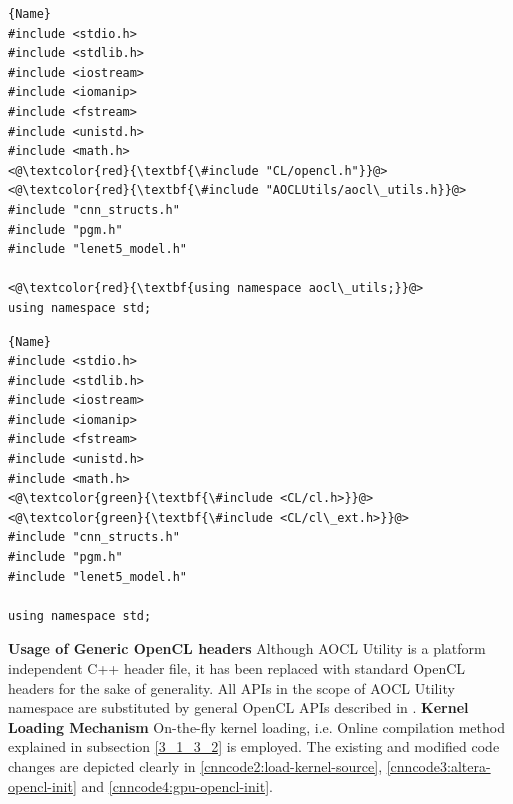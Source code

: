 \newcommand{\grn}{\makebox[0pt][l]{\color{hg}\rule[-4pt]{0.9\linewidth}{10pt}}}
\newcommand{\rd}{\makebox[0pt][l]{\color{hr}\rule[-4pt]{0.9\linewidth}{10pt}}}
\noindent\begin{minipage}{.45\textwidth}
\begin{lstlisting}[caption=Header files for Altera FPGA,frame=tlrb]{Name}
#include <stdio.h>
#include <stdlib.h>
#include <iostream>
#include <iomanip>
#include <fstream>
#include <unistd.h>
#include <math.h>
<@\textcolor{red}{\textbf{\#include "CL/opencl.h"}}@>
<@\textcolor{red}{\textbf{\#include "AOCLUtils/aocl\_utils.h}}@>
#include "cnn_structs.h"
#include "pgm.h"
#include "lenet5_model.h"

<@\textcolor{red}{\textbf{using namespace aocl\_utils;}}@>
using namespace std;
\end{lstlisting}
\end{minipage}\hfill
\begin{minipage}{.45\textwidth}
\begin{lstlisting}[caption=Header files for \\ GPU,frame=tlrb]{Name}
#include <stdio.h>
#include <stdlib.h>
#include <iostream>
#include <iomanip>
#include <fstream>
#include <unistd.h>
#include <math.h>
<@\textcolor{green}{\textbf{\#include <CL/cl.h>}}@>
<@\textcolor{green}{\textbf{\#include <CL/cl\_ext.h>}}@>
#include "cnn_structs.h"
#include "pgm.h"
#include "lenet5_model.h"

using namespace std;
\end{lstlisting}
\end{minipage}\newline
\textbf{Usage of Generic OpenCL headers} \newline
Although AOCL Utility is a platform independent C++ header file, it has been replaced with standard OpenCL headers for the sake of generality. All APIs in the scope of AOCL Utility namespace are substituted by general OpenCL APIs described in \cite{opencl_khronos}. \newline \newline
\textbf{Kernel Loading Mechanism}\newline
On-the-fly kernel loading, i.e. Online compilation method explained in subsection \ref{3_1_3_2} is employed. The existing and modified code changes are depicted clearly in \ref{cnncode2:load-kernel-source}, \ref{cnncode3:altera-opencl-init} and \ref{cnncode4:gpu-opencl-init}.\newline \newline
